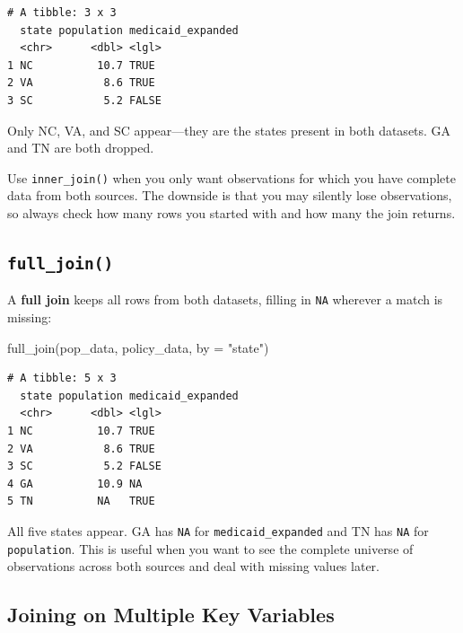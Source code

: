 \documentclass[
  letterpaper,
  DIV=11,
  numbers=noendperiod]{scrreprt}
\newenvironment{Shaded}{\begin{snugshade}}{\end{snugshade}}
\newcommand{\AttributeTok}[1]{\textcolor[rgb]{0.40,0.45,0.13}{#1}}
\newcommand{\FunctionTok}[1]{\textcolor[rgb]{0.28,0.35,0.67}{#1}}
\newcommand{\NormalTok}[1]{\textcolor[rgb]{0.00,0.23,0.31}{#1}}
\newcommand{\StringTok}[1]{\textcolor[rgb]{0.13,0.47,0.30}{#1}}
\begin{document}
\begin{verbatim}
# A tibble: 3 x 3
  state population medicaid_expanded
  <chr>      <dbl> <lgl>            
1 NC          10.7 TRUE             
2 VA           8.6 TRUE             
3 SC           5.2 FALSE            
\end{verbatim}

Only NC, VA, and SC appear---they are the states present in both
datasets. GA and TN are both dropped.

Use \texttt{inner\_join()} when you only want observations for which you
have complete data from both sources. The downside is that you may
silently lose observations, so always check how many rows you started
with and how many the join returns.

\subsection{\texorpdfstring{\texttt{full\_join()}}{full\_join()}}\label{full_join}

A \textbf{full join} keeps all rows from both datasets, filling in
\texttt{NA} wherever a match is missing:

\begin{Shaded}
\begin{Highlighting}[]
\FunctionTok{full\_join}\NormalTok{(pop\_data, policy\_data, }\AttributeTok{by =} \StringTok{"state"}\NormalTok{)}
\end{Highlighting}
\end{Shaded}

\begin{verbatim}
# A tibble: 5 x 3
  state population medicaid_expanded
  <chr>      <dbl> <lgl>            
1 NC          10.7 TRUE             
2 VA           8.6 TRUE             
3 SC           5.2 FALSE            
4 GA          10.9 NA               
5 TN          NA   TRUE             
\end{verbatim}

All five states appear. GA has \texttt{NA} for
\texttt{medicaid\_expanded} and TN has \texttt{NA} for
\texttt{population}. This is useful when you want to see the complete
universe of observations across both sources and deal with missing
values later.

\subsection{Joining on Multiple Key
Variables}\label{joining-on-multiple-key-variables}
\end{document}
